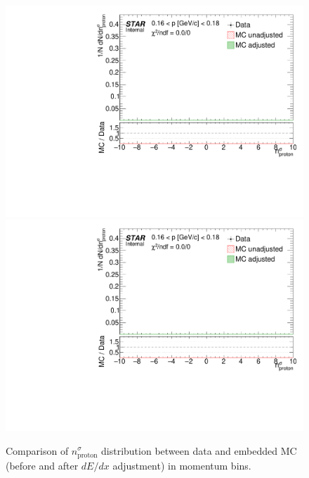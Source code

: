 \begin{figure}[ht]
\centering%
\caption[Comparison of $n^{\sigma}_{\text{proton}}$ distribution between data and embedded MC in momentum bins.]{Comparison of $n^{\sigma}_{\text{proton}}$ distribution between data and embedded MC (before and after $dE/dx$ adjustment) in momentum bins.}\label{fig:dEdxDataVsMC}
\parbox{0.495\textwidth}{
  \centering
  \includegraphics[width=\linewidth,page=10]{graphics/dedx/nSigmaProton_DataVsMC.pdf}\\[3pt]
  \includegraphics[width=\linewidth,page=12]{graphics/dedx/nSigmaProton_DataVsMC.pdf}\\[3pt]
}
\end{figure}
